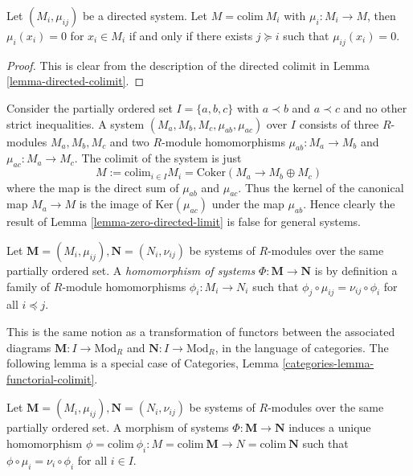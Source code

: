 \begin{lemma}
\label{lemma-zero-directed-limit}
Let $(M_i, \mu_{ij})$ be a directed system.
Let $M = \text{colim}\ M_i$ with $\mu_i : M_i\rightarrow M$,
then $\mu_i(x_i) = 0$ for $x_i\in M_i$ if and only if
there exists $j\succeq i$ such that $\mu_{ij}(x_i) = 0$.
\end{lemma}

\begin{proof}
This is clear from the description of the directed colimit
in Lemma \ref{lemma-directed-colimit}.
\end{proof}

\begin{example}
\label{example-zero-colimit-different}
Consider the partially ordered set $I = \{a, b, c\}$ with
$a \prec b$ and $a \prec c$ and no other strict inequalities.
A system $(M_a, M_b, M_c, \mu_{ab}, \mu_{ac})$
over $I$ consists of three $R$-modules $M_a, M_b, M_c$
and two $R$-module homomorphisms $\mu_{ab} : M_a \to M_b$ and
$\mu_{ac} : M_a \to M_c$.
The colimit of the system is just
$$
M := \text{colim}_{i \in I} M_i = \text{Coker}(M_a \to M_b \oplus M_c)
$$
where the map is the direct sum of $\mu_{ab}$ and $\mu_{ac}$.
Thus the kernel of the canonical map $M_a \to M$ is the image
of $\text{Ker}(\mu_{ac})$ under the map $\mu_{ab}$. Hence clearly
the result of Lemma \ref{lemma-zero-directed-limit} is false for
general systems.
\end{example}

\begin{definition}
\label{definition-homomorphism-directed-systems}
Let $\textbf{M} = (M_i, \mu_{ij}), \textbf{N} = (N_i, \nu_{ij})$ be
systems of $R$-modules over the same partially ordered set.
A {\it homomorphism of systems} $\Phi : \textbf{M}\rightarrow \textbf{N}$
is by definition a family of $R$-module homomorphisms
$\phi_i : M_i\rightarrow N_{i}$
such that $\phi_j \circ \mu_{ij} = \nu_{ij} \circ \phi_i$
for all $i \preceq j$.
\end{definition}

\noindent
This is the same notion as a transformation of functors
between the associated diagrams $\textbf{M} : I \to \text{Mod}_R$
and $\textbf{N} : I \to \text{Mod}_R$, in the language of
categories.
The following lemma is a special case of
Categories, Lemma \ref{categories-lemma-functorial-colimit}.

\begin{lemma}
\label{lemma-homomorphism-limit}
Let $\textbf{M} = (M_i, \mu_{ij}), \textbf{N} = (N_i, \nu_{ij})$ be
systems of $R$-modules over the same partially ordered set.
A morphism of systems $\Phi : \textbf{M}\rightarrow \textbf{N}$
induces a unique homomorphism
$\phi = \text{colim}\ \phi_{i}: M = \text{colim}\ \textbf{M}
\rightarrow N = \text{colim}\ \textbf{N}$ such that $\phi \circ
\mu_{i} = \nu_{i} \circ \phi_{i}$ for all $i\in I$.
\end{lemma}

